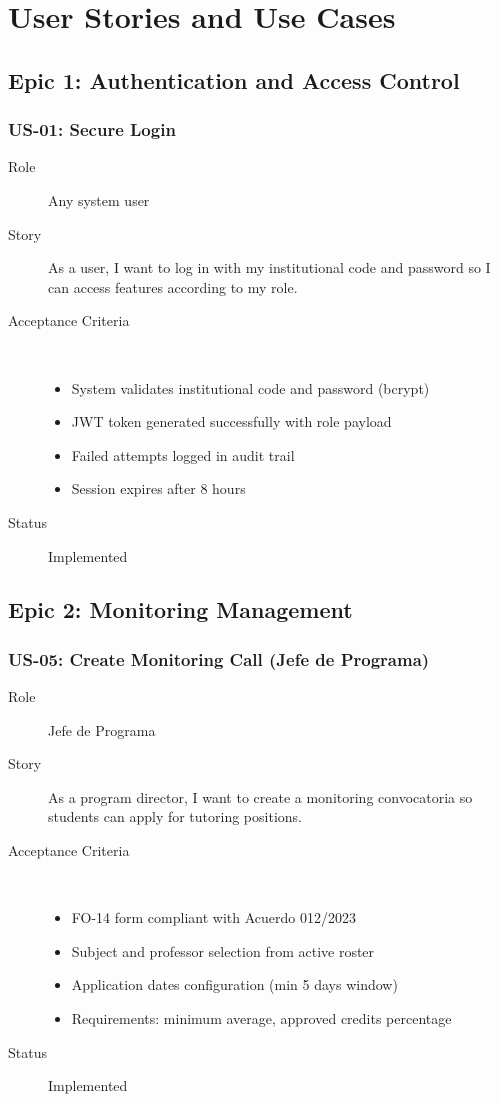 \documentclass[12pt,a4paper]{report}
\begin{document}
\chapter{User Stories and Use Cases}

\section{Epic 1: Authentication and Access Control}

\subsection{US-01: Secure Login}
\begin{description}
    \item[Role] Any system user
    \item[Story] As a user, I want to log in with my institutional code and password so I can access features according to my role.
    \item[Acceptance Criteria] ~
    \begin{itemize}
        \item System validates institutional code and password (bcrypt)
        \item JWT token generated successfully with role payload
        \item Failed attempts logged in audit trail
        \item Session expires after 8 hours
    \end{itemize}
    \item[Status] \textcolor{forestgreen}{\checkmark} Implemented
\end{description}

\section{Epic 2: Monitoring Management}

\subsection{US-05: Create Monitoring Call (Jefe de Programa)}
\begin{description}
    \item[Role] Jefe de Programa
    \item[Story] As a program director, I want to create a monitoring convocatoria so students can apply for tutoring positions.
    \item[Acceptance Criteria] ~
    \begin{itemize}
        \item FO-14 form compliant with Acuerdo 012/2023
        \item Subject and professor selection from active roster
        \item Application dates configuration (min 5 days window)
        \item Requirements: minimum average, approved credits percentage
    \end{itemize}
    \item[Status] \textcolor{forestgreen}{\checkmark} Implemented
\end{description}
\end{document}
